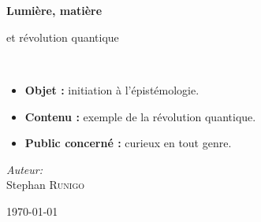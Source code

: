 \begin{titlepage}
%
~\\[1cm]

\begin{center}
\end{center}

\textsc{\Large }\\[0.5cm]

\HRule

\begin{center}
{\huge \bfseries  Lumière, matière\\ }
 
{\Large et révolution quantique\\}%
\end{center}

\HRule \\[1.5cm]

\vspace{3cm}
\begin{itemize}[leftmargin=1cm, label=, itemsep=2pt]
\item {\bf Objet :} initiation à l'épistémologie.
\item {\bf Contenu :} exemple de la révolution quantique.
\item {\bf Public concerné :} curieux en tout genre.
\end{itemize}
\vspace{3cm}


\begin{minipage}{0.4\textwidth}
\begin{flushleft} \large
\end{flushleft}
\end{minipage}
\begin{minipage}{0.4\textwidth}
\begin{flushright} \large
\emph{Auteur:}\\
Stephan \textsc{Runigo}
\end{flushright}
\end{minipage}

\vfill

{\large \today}

\end{titlepage}
